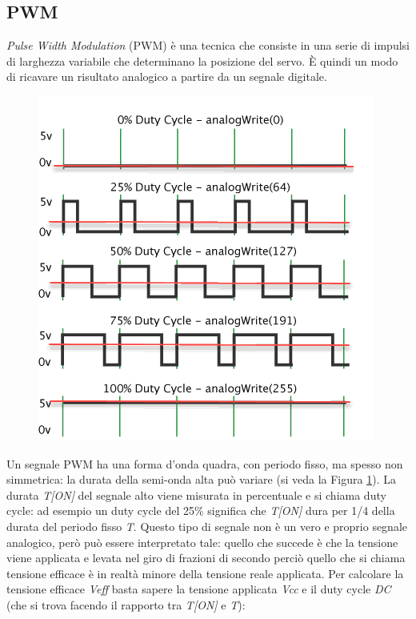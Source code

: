 \documentclass[12pt]{report}
\begin{document}
%
\subsection{PWM}
%

\emph{Pulse Width Modulation} (PWM) è una tecnica che consiste in una serie di impulsi di larghezza variabile che determinano la posizione del servo. È quindi un modo di ricavare un risultato analogico a partire da un segnale digitale. 

\begin{figure}
	\begin{center}
		\includegraphics[width=0.9\linewidth]{./img/pwm.png}
		\label{fig:pwm}
	\end{center}
\end{figure}


Un segnale PWM ha una forma d'onda quadra, con periodo fisso, ma spesso non simmetrica: la durata della semi-onda alta può variare (si veda la Figura \ref{fig:pwm}). La durata \textit{T[ON]} del segnale alto viene misurata in percentuale e si chiama duty cycle: ad esempio un duty cycle del 25\% significa che \textit{T[ON]} dura per 1/4 della durata del periodo fisso \textit{T}. Questo tipo di segnale non è un vero e proprio segnale analogico, però può essere interpretato tale: quello che succede è che la tensione viene applicata e levata nel giro di frazioni di secondo perciò quello che si chiama tensione efficace è in realtà minore della tensione reale applicata. Per calcolare la tensione efficace \textit{Veff} basta sapere la tensione applicata \textit{Vcc} e il duty cycle \textit{DC} (che si trova facendo il rapporto tra \textit{T[ON]} e \textit{T}):
\end{document}
